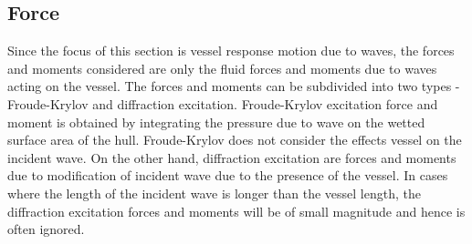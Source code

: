 \subsection{Force}

Since the focus of this section is vessel response motion due to waves, the
forces and moments considered are only the fluid forces and moments due to waves
acting on the vessel. The forces and moments can be subdivided into two types -
Froude-Krylov and diffraction excitation. Froude-Krylov excitation force and
moment is obtained by integrating the pressure due to wave on the wetted surface
area of the hull. Froude-Krylov does not consider the effects vessel on the
incident wave. On the other hand, diffraction excitation are forces and moments
due to modification of incident wave due to the presence of the vessel. In cases
where the length of the incident wave is longer than the vessel length, the
diffraction excitation forces and moments will be of small magnitude and hence
is often ignored. 

